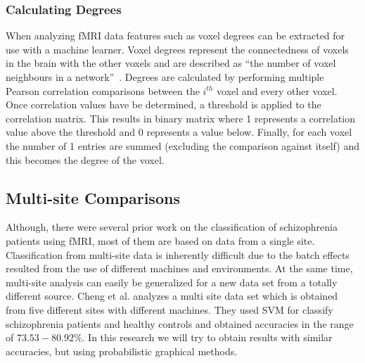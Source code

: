 \documentclass{article} %
\begin{document}
\subsubsection{Calculating Degrees}
When analyzing fMRI data features such as voxel degrees can be extracted for
use with a machine learner. Voxel degrees represent the connectedness of
voxels in the brain with the other voxels and are described as ``the number
of voxel neighbours in a network''~\cite{Rish_2013}. Degrees are calculated 
by performing
multiple Pearson correlation comparisons between the $i^{th}$ voxel and every
other voxel. Once correlation values have be determined, a threshold is
applied to the correlation matrix. This results in binary matrix where 1 
represents a correlation value above the threshold and 0 represents a value 
below. Finally, for each voxel the number of 1 entries are summed (excluding 
the comparison against itself) and this becomes the degree of the voxel.


\subsection{Multi-site Comparisons}
Although, there were several prior work on the classification of schizophrenia patients using fMRI, most of them are based on data from a single site. Classification from multi-site data is inherently difficult due to the batch effects resulted from the use of different machines and environments. At the same time, multi-site analysis can easily be generalized for a new data set from a totally different source. Cheng et al. \cite{Cheng2015} analyzes a multi site data set which is obtained from five different sites with different machines. They used SVM for classify schizophrenia patients and healthy controls and obtained accuracies in the range of $73.53- 80.92\%$. In this research we will try to obtain results with similar accuracies, but using probabilistic graphical methods.
\end{document}
